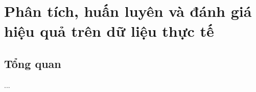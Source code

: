 \chapter{Phân tích, huấn luyên và đánh giá hiệu quả trên dữ liệu thực tế}
\section{Tổng quan}\label{ex-1}
...%
    
        
            
                
            
        
            
                
            
        
